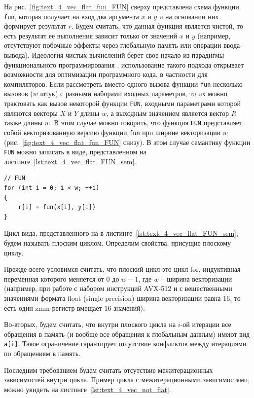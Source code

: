 На рис.~\ref{fig:text_4_vec_flat_fun_FUN} сверху представлена схема функции \texttt{fun}, которая получает на вход два аргумента $x$ и $y$ и на основании них формирует результат $r$.
Будем считать, что данная функция является чистой, то есть результат ее выполнения зависит только от значений $x$ и $y$ (например, отсутствуют побочные эффекты через глобальную память или операции ввода-вывода).
Идеология чистых вычислений берет свое начало из парадигмы функционального программирования \cite{Armstrong2013VecErlang}, использование такого подхода открывает возможности для оптимизации программного кода, в частности для компиляторов.
Если рассмотреть вместо одного вызова функции \texttt{fun} несколько вызовов ($w$ штук) с разными наборами входных параметров, то их можно трактовать как вызов некоторой функции \texttt{FUN}, входными параметрами которой являются векторы $X$ и $Y$ длины $w$, а выходным значением является вектор $R$ также длины $w$.
В этом случае можно говорить, что функция \texttt{FUN} представляет собой векторизованную версию функции \texttt{fun} при ширине векторизации $w$ (рис.~\ref{fig:text_4_vec_flat_fun_FUN} снизу).
В этом случае семантику функции \texttt{FUN} можно записать в виде, представленном на листинге~\ref{lst:text_4_vec_flat_FUN_sem}.

\begin{lstlisting}[caption={Семантика векторной функции \texttt{FUN} -- векторизованной версии функции \texttt{fun}.},label={lst:text_4_vec_flat_FUN_sem}]
// FUN
for (int i = 0; i < w; ++i)
{
   	r[i] = fun(x[i], y[i])
}
\end{lstlisting}

Цикл вида, представленного на в листинге~\ref{lst:text_4_vec_flat_FUN_sem}, будем называть плоским циклом.
Определим свойства, присущие плоскому циклу.

Прежде всего условимся считать, что плоский цикл это цикл for, индуктивная переменная которого меняется от $0$ до $w - 1$, где $w$ -- ширина векторизации (например, при работе с набором инструкций AVX-512 и с вещественными значениями формата float (single precision) ширина векторизации равна 16, то есть один zmm регистр вмещает 16 значений).

Во-вторых, будем считать, что внутри плоского цикла на $i$-ой итерации все обращения в память (и вообще все обращения к глобальным данным) имеют вид \texttt{a[i]}.
Такое ограничение гарантирует отсутствие конфликтов между итерациями по обращениям в память.

Последним требованием будем считать отсутствие межитерационных зависимостей внутри цикла.
Пример цикла с межитерационными зависимостями, можно увидеть на листинге~\ref{lst:text_4_vec_not_flat}.

